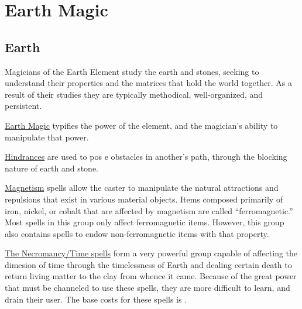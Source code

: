 \chapter{Earth Magic}
\label{Ch:elemental-earth-magic}

\section{Earth}
Magicians of the Earth Element study the earth and stones, seeking to understand their properties and the matrices that hold the world together. As a result of their studies they are typically methodical, well-organized, and persistent.

\ul{Earth Magic} typifies the power of the element, and the magician’s ability to manipulate that power.

\ul{Hindrances} are used to pos e obstacles in another’s path, through the blocking nature of earth and stone.

\ul{Magnetism} spells allow the caster to manipulate the natural attractions and repulsions that exist in various material objects. Items composed primarily of iron, nickel, or cobalt that are affected by magnetism are called “ferromagnetic.” Most spells in this group only affect ferromagnetic items. However, this group also contains spells to endow non-ferromagnetic items with that property.

\ul{The Necromancy/Time spells} form a very powerful group capable of affecting the dimesion of time through the timelessness of Earth and dealing certain death to return living matter to the clay from whence it came. Because of the great power that must be channeled to use these spells, they are more difficult to learn, and drain their user. The base costs for these spells is .

